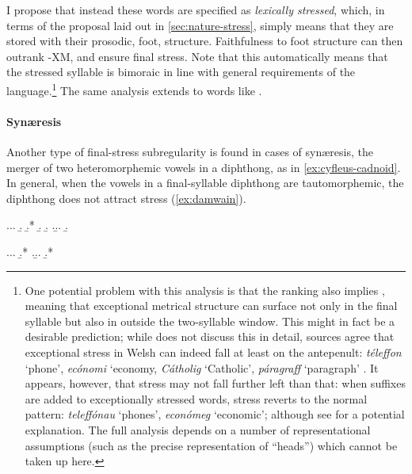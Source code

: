 I propose that instead these words are specified as \emph{lexically stressed}, which, in terms of the proposal laid out in \cref{sec:nature-stress}, simply means that they are stored with their prosodic, \ie foot, structure. Faithfulness to foot structure can then outrank \sy-\textsc{XM}, and ensure final stress. Note that this automatically means that the stressed syllable is bimoraic in line with general requirements of the language.\footnote{\label{fn:exceptional-stress}One potential problem with this analysis is that the ranking  also implies , meaning that exceptional metrical structure can surface not only in the final syllable but also in outside the two-syllable window. This might in fact be a desirable prediction; while \citet{awbery86:_pembr_welsh} does not discuss this in detail, sources agree that exceptional stress in Welsh can indeed fall at least on the antepenult: \emph{téleffon} `phone', \emph{ecónomi} `economy, \emph{Cátholig} `Catholic', \emph{páragraff} `paragraph' \citep[\egm][§IV.49]{gyg}. It appears, however, that stress may not fall further left than that: when suffixes are added to exceptionally stressed words, stress reverts to the normal pattern: \emph{teleffónau} `phones', \emph{económeg} `economic'; although see \citet{jurgec10:_disjun_lexic_strat} for a potential explanation. The full analysis depends on a number of representational assumptions (such as the precise representation of \enquote{heads}) which cannot be taken up here.} The same analysis extends to words like \ipa{[siˈment]}.

\paragraph{Synæresis}
\label{sec:synaresis}

Another type of final-stress subregularity is found in cases of synæresis, \ie the merger of two heteromorphemic vowels in a diphthong, as in \cref{ex:cyfleus-cadnoid}. In general, when the vowels in a final-syllable diphthong are tautomorphemic, the diphthong does not attract stress (\cref{ex:damwain}).

\ex.\label{ex:cyfleus-cadnoid}\a.\a.
\b.
\b.*\mbi{[ˈkəvleis]}
\b.
\b.
\z.\b.\a.
\b.

\ex.\label{ex:damwain}\a.\a.
\b.*\mbi{[damˈwain]}
\z.\b.\a.
\b.*\mbi{[kaˈnuiɬ]}

